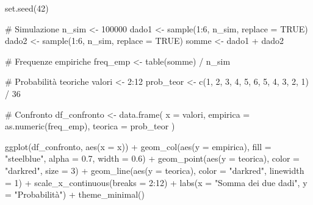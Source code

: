 \documentclass[
  letterpaper,
  DIV=11,
  numbers=noendperiod,
  oneside]{scrreprt}
\newenvironment{Shaded}{\begin{snugshade}}{\end{snugshade}}
\newcommand{\AttributeTok}[1]{\textcolor[rgb]{0.40,0.45,0.13}{#1}}
\newcommand{\CommentTok}[1]{\textcolor[rgb]{0.37,0.37,0.37}{#1}}
\newcommand{\ConstantTok}[1]{\textcolor[rgb]{0.56,0.35,0.01}{#1}}
\newcommand{\DecValTok}[1]{\textcolor[rgb]{0.68,0.00,0.00}{#1}}
\newcommand{\FloatTok}[1]{\textcolor[rgb]{0.68,0.00,0.00}{#1}}
\newcommand{\FunctionTok}[1]{\textcolor[rgb]{0.28,0.35,0.67}{#1}}
\newcommand{\NormalTok}[1]{\textcolor[rgb]{0.00,0.23,0.31}{#1}}
\newcommand{\OtherTok}[1]{\textcolor[rgb]{0.00,0.23,0.31}{#1}}
\newcommand{\SpecialCharTok}[1]{\textcolor[rgb]{0.37,0.37,0.37}{#1}}
\newcommand{\StringTok}[1]{\textcolor[rgb]{0.13,0.47,0.30}{#1}}
\theoremstyle{definition}
\theoremstyle{plain}
\theoremstyle{definition}
\theoremstyle{remark}
\begin{document}
\begin{Shaded}
\begin{Highlighting}[]
\FunctionTok{set.seed}\NormalTok{(}\DecValTok{42}\NormalTok{)}

\CommentTok{\# Simulazione}
\NormalTok{n\_sim }\OtherTok{\textless{}{-}} \DecValTok{100000}
\NormalTok{dado1 }\OtherTok{\textless{}{-}} \FunctionTok{sample}\NormalTok{(}\DecValTok{1}\SpecialCharTok{:}\DecValTok{6}\NormalTok{, n\_sim, }\AttributeTok{replace =} \ConstantTok{TRUE}\NormalTok{)}
\NormalTok{dado2 }\OtherTok{\textless{}{-}} \FunctionTok{sample}\NormalTok{(}\DecValTok{1}\SpecialCharTok{:}\DecValTok{6}\NormalTok{, n\_sim, }\AttributeTok{replace =} \ConstantTok{TRUE}\NormalTok{)}
\NormalTok{somme }\OtherTok{\textless{}{-}}\NormalTok{ dado1 }\SpecialCharTok{+}\NormalTok{ dado2}

\CommentTok{\# Frequenze empiriche}
\NormalTok{freq\_emp }\OtherTok{\textless{}{-}} \FunctionTok{table}\NormalTok{(somme) }\SpecialCharTok{/}\NormalTok{ n\_sim}

\CommentTok{\# Probabilità teoriche}
\NormalTok{valori }\OtherTok{\textless{}{-}} \DecValTok{2}\SpecialCharTok{:}\DecValTok{12}
\NormalTok{prob\_teor }\OtherTok{\textless{}{-}} \FunctionTok{c}\NormalTok{(}\DecValTok{1}\NormalTok{, }\DecValTok{2}\NormalTok{, }\DecValTok{3}\NormalTok{, }\DecValTok{4}\NormalTok{, }\DecValTok{5}\NormalTok{, }\DecValTok{6}\NormalTok{, }\DecValTok{5}\NormalTok{, }\DecValTok{4}\NormalTok{, }\DecValTok{3}\NormalTok{, }\DecValTok{2}\NormalTok{, }\DecValTok{1}\NormalTok{) }\SpecialCharTok{/} \DecValTok{36}

\CommentTok{\# Confronto}
\NormalTok{df\_confronto }\OtherTok{\textless{}{-}} \FunctionTok{data.frame}\NormalTok{(}
  \AttributeTok{x =}\NormalTok{ valori,}
  \AttributeTok{empirica =} \FunctionTok{as.numeric}\NormalTok{(freq\_emp),}
  \AttributeTok{teorica =}\NormalTok{ prob\_teor}
\NormalTok{)}

\FunctionTok{ggplot}\NormalTok{(df\_confronto, }\FunctionTok{aes}\NormalTok{(}\AttributeTok{x =}\NormalTok{ x)) }\SpecialCharTok{+}
  \FunctionTok{geom\_col}\NormalTok{(}\FunctionTok{aes}\NormalTok{(}\AttributeTok{y =}\NormalTok{ empirica), }\AttributeTok{fill =} \StringTok{"steelblue"}\NormalTok{, }\AttributeTok{alpha =} \FloatTok{0.7}\NormalTok{, }\AttributeTok{width =} \FloatTok{0.6}\NormalTok{) }\SpecialCharTok{+}
  \FunctionTok{geom\_point}\NormalTok{(}\FunctionTok{aes}\NormalTok{(}\AttributeTok{y =}\NormalTok{ teorica), }\AttributeTok{color =} \StringTok{"darkred"}\NormalTok{, }\AttributeTok{size =} \DecValTok{3}\NormalTok{) }\SpecialCharTok{+}
  \FunctionTok{geom\_line}\NormalTok{(}\FunctionTok{aes}\NormalTok{(}\AttributeTok{y =}\NormalTok{ teorica), }\AttributeTok{color =} \StringTok{"darkred"}\NormalTok{, }\AttributeTok{linewidth =} \DecValTok{1}\NormalTok{) }\SpecialCharTok{+}
  \FunctionTok{scale\_x\_continuous}\NormalTok{(}\AttributeTok{breaks =} \DecValTok{2}\SpecialCharTok{:}\DecValTok{12}\NormalTok{) }\SpecialCharTok{+}
  \FunctionTok{labs}\NormalTok{(}\AttributeTok{x =} \StringTok{"Somma dei due dadi"}\NormalTok{, }\AttributeTok{y =} \StringTok{"Probabilità"}\NormalTok{) }\SpecialCharTok{+}
  \FunctionTok{theme\_minimal}\NormalTok{()}
\end{Highlighting}
\end{Shaded}
\end{document}
